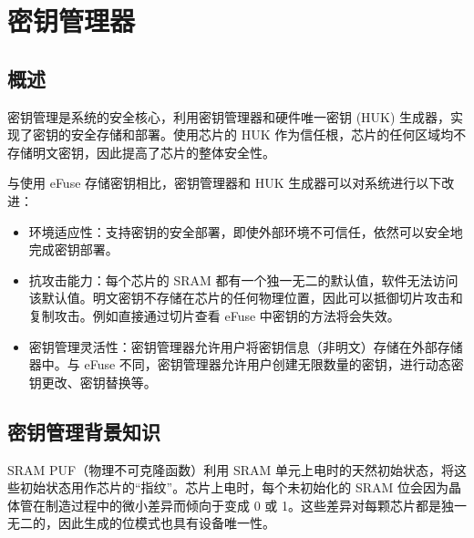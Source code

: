 \documentclass[main\_\_CN.tex]{subfiles}
\begin{document}

\ifglobal
\else
    \listoftodos
    {\let\clearpage\relax \listofdonetodos}
    \tableofcontents
\fi




\hypertarget{keymng}{}
\chapter{密钥管理器}
\label{mod:keymng}

\section{概述}
密钥管理是系统的安全核心，利用密钥管理器和硬件唯一密钥 (HUK) 生成器，实现了密钥的安全存储和部署。使用芯片的 HUK 作为信任根，芯片的任何区域均不存储明文密钥，因此提高了芯片的整体安全性。


与使用 eFuse 存储密钥相比，密钥管理器和 HUK 生成器可以对系统进行以下改进：
\begin{itemize}
    \item 环境适应性：支持密钥的安全部署，即使外部环境不可信任，依然可以安全地完成密钥部署。
    \item 抗攻击能力：每个芯片的 SRAM 都有一个独一无二的默认值，软件无法访问该默认值。明文密钥不存储在芯片的任何物理位置，因此可以抵御切片攻击和复制攻击。例如直接通过切片查看 eFuse 中密钥的方法将会失效。
    \item 密钥管理灵活性：密钥管理器允许用户将密钥信息（非明文）存储在外部存储器中。与 eFuse 不同，密钥管理器允许用户创建无限数量的密钥，进行动态密钥更改、密钥替换等。

\end{itemize}

\section{密钥管理背景知识}

SRAM PUF（物理不可克隆函数）利用 SRAM 单元上电时的天然初始状态，将这些初始状态用作芯片的“指纹”。芯片上电时，每个未初始化的 SRAM 位会因为晶体管在制造过程中的微小差异而倾向于变成 0 或 1。这些差异对每颗芯片都是独一无二的，因此生成的位模式也具有设备唯一性。
\end{document}
